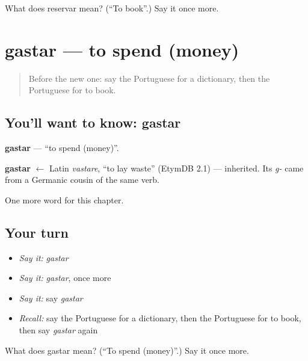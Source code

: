 \begin{tcolorbox}[breakable,colback=teal!4,colframe=teal!35!black,title={Before you move on}]
What does reservar mean? (\textquotedblleft{}To book\textquotedblright{}.) Say it once more.
\end{tcolorbox}
\section[gastar]{gastar — to spend (money)}

\label{lesson:PT-C201-gastar}



\begin{quote}
Before the new one: say the Portuguese for a dictionary, then the Portuguese for to book.
\end{quote}

\subsection*{You'll want to know: gastar}
\textbf{gastar} — \textquotedblleft{}to spend (money)\textquotedblright{}.

\begin{cousinweb}
\textbf{gastar} $\leftarrow$ Latin \emph{vastare}, \textquotedblleft{}to lay waste\textquotedblright{} (EtymDB 2.1) — inherited. Its \emph{g-} came from a Germanic cousin of the same verb.
\end{cousinweb}

\begin{grammarlens}[title={What you've built}]
One more word for this chapter.
\end{grammarlens}

\subsection*{Your turn}
\begin{itemize}
\raggedright
  \item \emph{Say it:} \emph{gastar}
  \item \emph{Say it:} \emph{gastar}, once more
  \item \emph{Say it:} say \emph{gastar}
  \item \emph{Recall:} say the Portuguese for a dictionary, then the Portuguese for to book, then say \emph{gastar} again
\end{itemize}

\begin{tcolorbox}[breakable,colback=teal!4,colframe=teal!35!black,title={Before you move on}]
What does gastar mean? (\textquotedblleft{}To spend (money)\textquotedblright{}.) Say it once more.
\end{tcolorbox}
